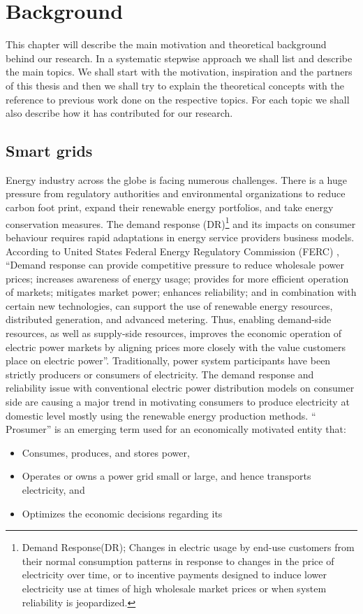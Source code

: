 \chapter{Background}
\label{chapter:background} 

This chapter will describe the main motivation and theoretical background behind our research. In a systematic stepwise approach we shall list and describe the main topics. We shall start with the motivation, inspiration and the partners of this thesis and then we shall try to explain the theoretical concepts with the reference to previous work done on the respective topics. For each topic we shall also describe how it has contributed for our research. 

\section{Smart grids }

Energy industry across the globe is facing numerous challenges. There is a huge pressure from regulatory authorities and environmental organizations to reduce carbon foot print, expand their renewable energy portfolios, and take energy conservation measures. The demand response (DR)\footnote{Demand Response(DR); Changes in electric usage by end-use customers from their normal consumption patterns in response to changes in the price of electricity over time, or to incentive payments designed to induce lower electricity use at times of high wholesale market prices or when system reliability is jeopardized.} and its impacts on consumer behaviour requires rapid adaptations in energy service providers business models. According to United States Federal Energy Regulatory Commission (FERC) , ``Demand response can provide competitive pressure to reduce wholesale power prices; increases awareness of energy usage; provides for more efficient operation of markets; mitigates market power; enhances reliability; and in combination with certain new technologies, can support the use of renewable energy resources, distributed generation, and advanced metering. Thus, enabling demand-side resources, as well as supply-side resources, improves the economic operation of electric power markets by aligning prices more closely with the value customers place on electric power''\cite{federal2008assessment}.  
Traditionally, power system participants have been strictly producers or consumers of electricity. The demand response and reliability issue with conventional electric power distribution models on consumer side are causing a major trend in motivating consumers to produce electricity at domestic level mostly using the renewable energy production methods.  `` Prosumer'' is an emerging term used for an economically motivated entity that: \cite{grijalva2011prosumer}
\begin{itemize}
\item Consumes, produces, and stores power,
\item Operates or owns a power grid small or large, and hence transports electricity, and
\item Optimizes the economic decisions regarding its
\end{itemize}

